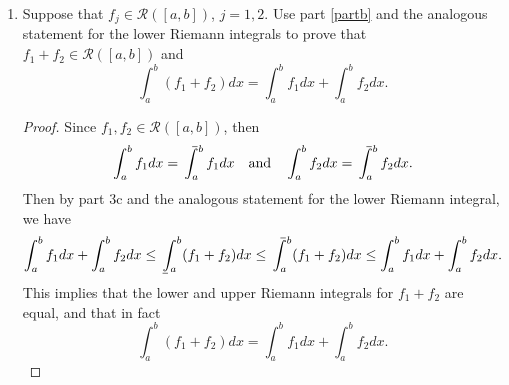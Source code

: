 \documentclass[12pt]{article}
\newcommand{\N}{\mathbb{N}}
\newcommand{\RR}{\mathcal{R}}
\newcommand{\seq}[1]{\left\{#1\right\}_{n=1}^\infty}
\newcommand{\isp}[1]{\quad\text{#1}\quad}
\def\upint{\mathchoice%
    {\mkern13mu\overline{\vphantom{\intop}\mkern7mu}\mkern-20mu}%
    {\mkern7mu\overline{\vphantom{\intop}\mkern7mu}\mkern-14mu}%
    {\mkern7mu\overline{\vphantom{\intop}\mkern7mu}\mkern-14mu}%
    {\mkern7mu\overline{\vphantom{\intop}\mkern7mu}\mkern-14mu}%
  \int}
\def\lowint{\mkern3mu\underline{\vphantom{\intop}\mkern7mu}\mkern-10mu\int}
\begin{document}
\begin{enumerate}
\begin{enumerate}
\begin{proof}
    Define
    \[U_1 = \upint_a^bf_1dx \isp{and} U_2 = \upint_a^bf_2dx \isp{and} U_3=\upint_a^b(f_1+f_2)dx.\]
    We construct two sequences $\seq{P_n}$ and $\seq{Q_n}$ whose terms are partitions of $[a,b]$ such that
    \[U(P_n,f_1)\in\left[U_1, U_1+\frac1n\right] \isp{and} U(Q_n,f_2)\in\left[U_2, U_2+\frac1n\right].\]
    This is possible as $U_1$ and $U_2$ are defined as the infimums of the functions $U(-,f_1)$ and $U(-,f_2)$ over all partitions, respectively, and we can always find partitions whose images under these functions are arbitrarily close to the infimums. This construction gives us
    \[U(P_n,f_1) \to U_1 \isp{and} U(Q_n,f_2) \to U_3.\]
    In a similar manner, we define a third sequence $\seq{R_n}$ of partitions of $[a,b]$ such that
    \[U(R_n,f_1+f_2)\in\left[U_3, U_3+\frac1n\right].\]
    And similarly, $U(R_n,f_1+f_2) \to U_3$. Now for each $n\in\N$, we define the partition
    \[S_n = P_n\cup Q_n\cup R_n\]
    of $[a,b]$. Since $S_n$ is a refinement of the three partitions, we have
    \begin{alignat*}{6}
        U_1 &\leq&\,\,& U(S_n,f_1) &&\leq&\,\,& U(P_n,f_1) &&\to&\,\,&U_1, \\
        U_2 &\leq&& U(S_n,f_2) &&\leq&& U(Q_n,f_2) &&\to&&U_2, \\
        U_3 &\leq&& U(S_n,f_1+f_2) &&\leq&& U(R_n,f_1+f_2) &&\to&&U_3.
    \end{alignat*}
    So we have
    \begin{align*}
       U(S_n,f_1) &\to U_1, \\
       U(S_n,f_2) &\to U_2, \\
       U(S_n,f_1+f_2) &\to U_3.
    \end{align*}
    Then from part 3b, we have
    \[U(S_n,f_1+f_2) \leq U(S_n,f_1) + U(S_n,f_2).\]
    And letting $n\to\infty$, we obtain the desired result
    \[U_3 = U_1 + U_2.\]
     
    
\end{proof}

\item
Suppose that $f_j\in\RR([a,b])$, $j=1,2$.  Use part \eqref{partb} and the analogous statement for the
lower Riemann integrals to prove that $f_1+f_2\in \RR([a,b])$ and
\[\int_a^b(f_1+f_2)dx = \int_a^bf_1dx+\int_a^bf_2dx.\]

\begin{proof}
    Since $f_1,f_2\in\RR([a,b])$, then
    \[\int_a^bf_1dx = \upint_a^bf_1dx \isp{and} \int_a^bf_2dx = \upint_a^bf_2dx.\]
    Then by part 3c and the analogous statement for the lower Riemann integral, we have
    \[\int_a^bf_1dx+\int_a^bf_2dx \leq \lowint_a^b(f_1+f_2)dx \leq \upint_a^b(f_1+f_2)dx\leq \int_a^bf_1dx+\int_a^bf_2dx.\]
    This implies that the lower and upper Riemann integrals for $f_1+f_2$ are equal, and that in fact
    \[\int_a^b(f_1+f_2)dx = \int_a^bf_1dx+\int_a^bf_2dx.\]


\end{proof}
\end{enumerate}
\end{enumerate}
\end{document}
